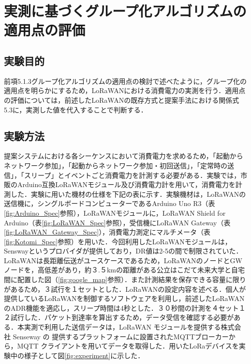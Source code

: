 \chapter{実測に基づくグループ化アルゴリズムの適用点の評価}

\section{実験目的}
前項5.1.3グループ化アルゴリズムの適用点の検討で述べたように，グループ化の適用点を明らかにするため，LoRaWANにおける消費電力の実測を行う．適用点の評価については，前述したLoRaWANの既存方式と提案手法における関係式5.3に，実測した値を代入することで判断する．

\section{実験方法}
提案システムにおける各シーケンスにおいて消費電力を求めるため，「起動からネットワーク参加」，「起動からネットワーク参加・初回送信」，「定常時の送信」，「スリープ」とイベントごと消費電力を計測する必要がある．実験では，市販のArduino互換LoRaWANモジュール及び消費電力計を用いて，消費電力を計測した．実験に用いた機材の仕様を下記の表に示す．実験機材は，LoRaWANの送信機に，シングルボードコンピューターであるArduino Uno R3（表\ref{fig:Arduino_Spec}参照），LoRaWANモジュールに，LoRaWAN Shield for Arduino\cite{lorashield}（表\ref{fig:LoRaWAN_Spec}参照），受信機にLoRaWAN Gateway\cite{loragateway}（表\ref{fig:LoRaWAN_Gateway_Spec}），消費電力測定にマルチメータ\cite{kotomi}（表\ref{fig:Kotomi_Spec}参照）を用いた．今回利用したLoRaWANモジュールは，Senswayというプロバイダが提供しており，DR値は2-5の間で制限されていた\cite{lorawanshielduse}．LoRaWANは長距離伝送がユースケースであるため，LoRaWANのノードとGWノードを，高低差があり，約３.５kmの距離がある公立はこだて未来大学と自宅間に配置した図（\ref{fig:google_map}参照）．また計測結果を保存できる容量に限りがあるため，３試行を１セットとした．LoRaWANの設定内容を述べる．個人が提供しているLoRaWANを制御するソフトウェア\cite{lorawanlibrary}を利用し，前述したLoRaWANのADR機能を適応し，スリープ時間は4秒とした．３０秒間の計測を４セット１２試行した．パケット到達率を算出するため，データ受信を確認する必要がある．本実測で利用した送信データは，LoRaWAN モジュールを提供する株式会社 Senseway の
提供するプラットフォームに設置されたMQTTブローカーから，MQTT クライアント\cite{mqtttool}を用いてデータを取得した．用いたLoRaデバイスを実験中の様子として図\ref{fig:experiment}に示した．

